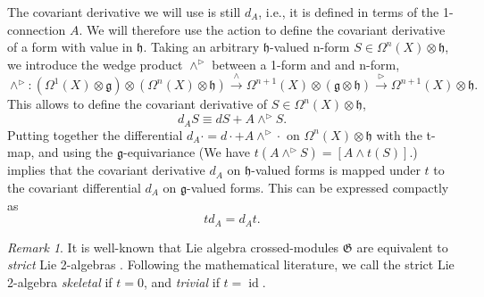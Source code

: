 \documentclass[onecolumn]{article}
\theoremstyle{theorem}
\theoremstyle{remark}
\newtheorem{remark}{Remark}[section]
\theoremstyle{example}
\theoremstyle{definition}
\numberwithin{equation}{section}
\def\g{\mathfrak g}
\def\h{\mathfrak h}
\begin{document}
The covariant derivative we will use is still $d_A$, i.e., it is defined in terms of the 1-connection $A$. We will therefore use the action to define the covariant derivative of a form with value in $\h$.  Taking an arbitrary $\mathfrak{h}$-valued n-form  $S\in\Omega^n(X)\otimes\mathfrak{h}$, we introduce the wedge product $\wedge^\rhd$ between a 1-form and and n-form,  $$\wedge^\rhd: (\Omega^1(X)\otimes \mathfrak{g})\otimes(\Omega^n(X)\otimes\mathfrak{h}) \xrightarrow{\wedge} \Omega^{n+1}(X)\otimes(\mathfrak{g}\otimes\mathfrak{h}) \xrightarrow{\rhd} \Omega^{n+1}(X)\otimes\mathfrak{h}.$$ 
{This} allows to define the covariant derivative of $S\in\Omega^n(X)\otimes\mathfrak{h}$, 
$$
d_AS\equiv dS + A \wedge^\rhd S. 
$$
{Putting} together the  differential $d_A\cdot =d\cdot  +A\wedge^\rhd \cdot$ on $\Omega^n(X)\otimes\mathfrak{h}$ with the t-map,  and using the $\g$-equivariance {(We have $t(A \wedge^\rhd S)= [A\wedge t(S)]$.)} implies that the covariant derivative $d_A$ on $\mathfrak{h}$-valued forms is mapped under $t$ to the covariant differential $d_A$ on $\mathfrak{g}$-valued forms. This can be expressed compactly as 
\begin{equation}\label{td=dt}
    td_A = d_At.
\end{equation}

\begin{remark}\label{xmod2alg}
It is well-known that Lie algebra crossed-modules $\mathfrak{G}$ are equivalent to {\it strict} Lie 2-algebras \cite{Wag:2006,Bai_2013}. Following the mathematical literature, we call the strict Lie 2-algebra {\it skeletal} if $t=0$, and {\it trivial} if $t=\operatorname{id}$.

\end{remark}
\end{document}
